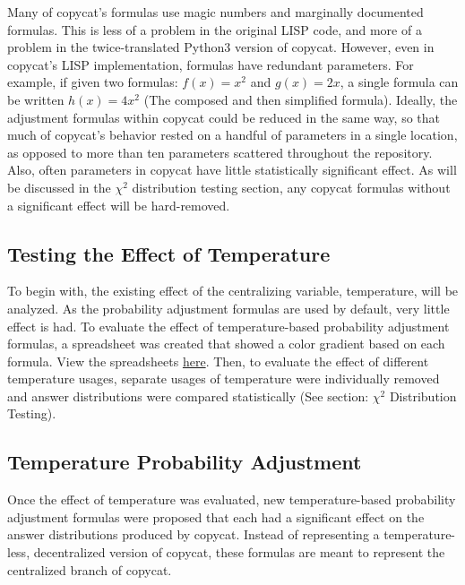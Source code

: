 \documentclass[a4paper]{article}
\begin{document}
        Many of copycat's formulas use magic numbers and marginally documented formulas.
        This is less of a problem in the original LISP code, and more of a problem in the twice-translated Python3 version of copycat.
        However, even in copycat's LISP implementation, formulas have redundant parameters.
        For example, if given two formulas: $f(x) = x^2$ and $g(x) = 2x$, a single formula can be written $h(x) = 4x^2$ (The composed and then simplified formula).
        Ideally, the adjustment formulas within copycat could be reduced in the same way, so that much of copycat's behavior rested on a handful of parameters in a single location, as opposed to more than ten parameters scattered throughout the repository.
        Also, often parameters in copycat have little statistically significant effect.
        As will be discussed in the $\chi^2$ distribution testing section, any copycat formulas without a significant effect will be hard-removed.

    \subsection{Testing the Effect of Temperature}

        To begin with, the existing effect of the centralizing variable, temperature, will be analyzed.
        As the probability adjustment formulas are used by default, very little effect is had.
        To evaluate the effect of temperature-based probability adjustment formulas, a spreadsheet was created that showed a color gradient based on each formula.
        View the spreadsheets \href{https://docs.google.com/spreadsheets/d/1JT2yCBUAsFzMcbKsQUcH1DhcBbuWDKTgPvUwD9EqyTY/edit?usp=sharing}{here}.
        Then, to evaluate the effect of different temperature usages, separate usages of temperature were individually removed and answer distributions were compared statistically (See section: $\chi^2$ Distribution Testing).

    \subsection{Temperature Probability Adjustment}

        Once the effect of temperature was evaluated, new temperature-based probability adjustment formulas were proposed that each had a significant effect on the answer distributions produced by copycat.
        Instead of representing a temperature-less, decentralized version of copycat, these formulas are meant to represent the centralized branch of copycat.
\end{document}
